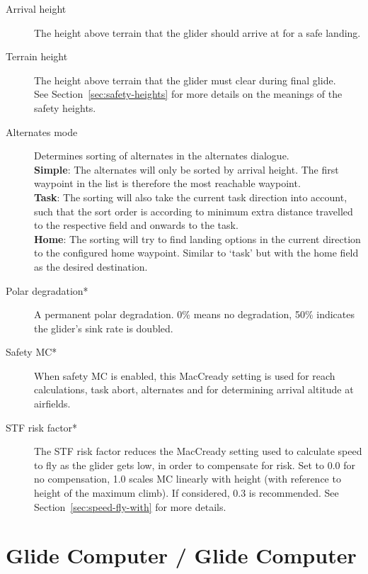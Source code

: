 \begin{description}
\item[Arrival height]  The height above terrain that the glider
  should arrive at for a safe landing.
\item[Terrain height]  \label{conf:safetyterrain} The height above terrain that 
  the glider must clear during final glide.
\\
See Section~\ref{sec:safety-heights} for more details on the meanings
of the safety heights.
\\
\item[Alternates mode]  \label{conf:alternatesmode} Determines sorting of alternates 
  in the alternates dialogue. \\
  {\bf Simple}: The alternates will only be sorted by arrival height. 
    The first waypoint in the list is therefore the most reachable waypoint. \\
  {\bf Task}: The sorting will also take the current task direction into account, 
    such that the sort order is according to minimum extra distance travelled to 
    the respective field and onwards to the task. \\
  {\bf Home}: The sorting will try to find landing options in the current direction 
    to the configured home waypoint.  Similar to `task' but with 
    the home field as the desired destination.
\item[Polar degradation*]  A permanent polar degradation. 0\% means no degradation, 
  50\% indicates the glider's sink rate is doubled.
\item[Safety MC*]  When safety MC is enabled, this MacCready setting is used for reach 
  calculations, task abort, alternates and for determining arrival altitude at airfields. 
\item[STF risk factor*] 
  The STF risk factor reduces the MacCready setting used to calculate
  speed to fly as the glider gets low, in order to compensate for
  risk.  Set to 0.0 for no compensation, 1.0 scales MC linearly with
  height (with reference to height of the maximum climb). If considered, 0.3 is recommended.  
  See Section~\ref{sec:speed-fly-with} for more details.
\end{description}


\section{Glide Computer / Glide Computer}\label{sec:final-glide}

